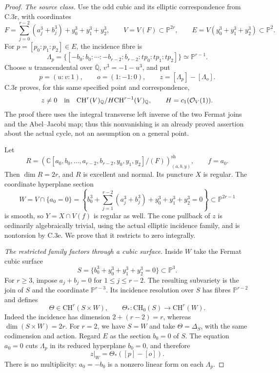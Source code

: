 \begin{proof}
\emph{The source class.}
Use the odd cubic and its elliptic correspondence from C.3r,
with coordinates
\[
 F=\sum_{j=0}^{r-2}(a_j^3+b_j^3)+y_0^3+y_1^3+y_2^3,
 \qquad V=V(F)\subset\mathbb P^{2r},
 \qquad E=V(y_0^3+y_1^3+y_2^3)\subset\mathbb P^2.
\]
For $p=[p_0:p_1:p_2]\in E$, the incidence fibre is
\[
 \Lambda_p=
 \{[-b_0:b_0:\cdots:-b_{r-2}:b_{r-2}:tp_0:tp_1:tp_2]\}
                       \simeq\mathbb P^{r-1}.
\]
Choose $u$ transcendental over $\overline{\mathbb Q}$,
$v^3=-1-u^3$, and put
\[
 p=(u:v:1),\qquad o=(1:-1:0),\qquad
 z=[\Lambda_p]-[\Lambda_o].
\]
C.3r proves, for this same specified point and correspondence,
\[
 z\ne0\quad\hbox{in}\quad
 \mathrm{CH}^r(V)_{\mathbb Q}/
       H\mathrm{CH}^{r-1}(V)_{\mathbb Q},
       \qquad H=c_1(\mathcal O_V(1)).
\]
The proof there uses the integral transverse left inverse
of the two Fermat joins and the Abel--Jacobi map; thus this
nonvanishing is an already proved assertion about the actual
cycle, not an assumption on a general point.

Let
\[
 R=\left(\mathbb C[a_0,b_0,\ldots,a_{r-2},b_{r-2},
                        y_0,y_1,y_2]/(F)\right)_{(a,b,y)}^{\mathrm{sh}},
 \qquad f=a_0.
\]
Then $\dim R=2r$, and $R$ is excellent and normal. Its
puncture $X$ is regular. The coordinate hyperplane section
\[
 W=V\cap\{a_0=0\}
   =\left\{b_0^3+\sum_{j=1}^{r-2}(a_j^3+b_j^3)
                         +y_0^3+y_1^3+y_2^3=0\right\}
                    \subset\mathbb P^{2r-1}
\]
is smooth, so $Y=X\cap V(f)$ is regular as well.
The cone pullback of $z$ is ordinarily algebraically trivial,
using the actual elliptic incidence family, and is nontorsion
by C.3e. We prove that it restricts to zero integrally.

\emph{The restricted family factors through a cubic surface.}
Inside $W$ take the Fermat cubic surface
\[
 S=\{b_0^3+y_0^3+y_1^3+y_2^3=0\}\subset\mathbb P^3.
\]
For $r\ge3$, impose $a_j+b_j=0$ for $1\le j\le r-2$.
The resulting subvariety is the join of $S$ and the
coordinate $\mathbb P^{r-3}$. Its incidence resolution
over $S$ has fibres $\mathbb P^{r-2}$ and defines
\[
 \Theta\in\mathrm{CH}^r(S\times W),
 \qquad \Theta_*:\mathrm{CH}_0(S)\longrightarrow\mathrm{CH}^r(W).
\]
Indeed the incidence has dimension $2+(r-2)=r$, whereas
$\dim(S\times W)=2r$. For $r=2$, we have $S=W$ and take
$\Theta=\Delta_S$, with the same codimension and action.
Regard $E$ as the section $b_0=0$ of $S$. The equation
$a_0=0$ cuts $\Lambda_p$ in its reduced hyperplane
$b_0=0$, and therefore
\[
             z|_W=\Theta_*([p]-[o]).
\]
There is no multiplicity: $a_0=-b_0$ is a nonzero linear
form on each $\Lambda_p$.


\end{proof}
